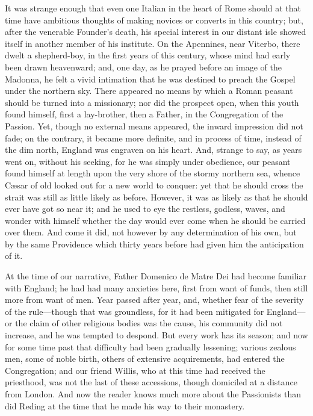 It was strange enough that even one Italian in the heart of Rome
should at that time have ambitious thoughts of making novices or
converts in this country; but, after the venerable Founder's
death, his special interest in our distant isle showed itself in
another member of his institute. On the Apennines, near Viterbo, there
dwelt a shepherd-boy, in the first years of this century, whose mind
had early been drawn heavenward; and, one day, as he prayed before an
image of the Madonna, he felt a vivid intimation that he was destined
to preach the Gospel under the northern sky. There appeared no means
by which a Roman peasant should be turned into a missionary; nor did
the prospect open, when this youth found himself, first a lay-brother,
then a Father, in the Congregation of the Passion. Yet, though no
external means appeared, the inward impression did not fade; on the
contrary, it became more definite, and in process of time, instead of
the dim north, England was engraven on his heart. And, strange to say,
as years went on, without his seeking, for he was simply under
obedience, our peasant found himself at length upon the very shore of
the stormy northern sea, whence Cæsar of old looked out for a new
world to conquer: yet that he should cross the strait was still as
little likely as before. However, it was as likely as that he should
ever have got so near it; and he used to eye the restless, godless,
waves, and wonder with himself whether the day would ever come when he
should be carried over them. And come it did, not however by any
determination of his own, but by the same Providence which thirty
years before had given him the anticipation of it.

At the time of our narrative, Father Domenico de Matre Dei had
become familiar with England; he had had many anxieties here,
first from want of funds, then still more from want of men. Year
passed after year, and, whether fear of the severity of the rule—though
that was groundless, for it had been mitigated for England—or the
claim of other religious bodies was the cause, his community did not
increase, and he was tempted to despond. But every work has its
season; and now for some time past that difficulty had been gradually
lessening; various zealous men, some of noble birth, others of
extensive acquirements, had entered the Congregation; and our friend
Willis, who at this time had received the priesthood, was not the last
of these accessions, though domiciled at a distance from London. And
now the reader knows much more about the Passionists than did Reding
at the time that he made his way to their monastery.


